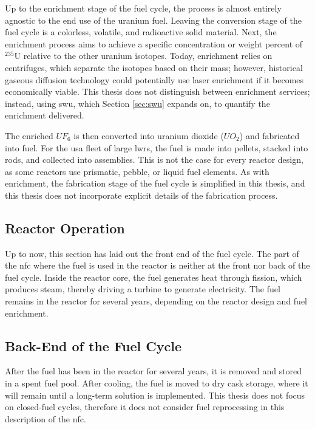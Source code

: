 Up to the enrichment stage of the fuel cycle, the process is almost entirely agnostic to the end use of the uranium fuel. Leaving the conversion stage of the fuel cycle is a colorless, volatile, and radioactive solid material. Next, the enrichment process aims to achieve a specific concentration or weight percent of $^{235}$U relative to the other uranium isotopes. Today, enrichment relies on centrifuges, which separate the isotopes based on their mass; however, historical gaseous diffusion technology could potentially use laser enrichment if it becomes economically viable. This thesis does not distinguish between enrichment services; instead, using \gls{swu}, which Section \ref{sec:swu} expands on, to quantify the enrichment delivered.

The enriched $UF_6$ is then converted into uranium dioxide ($UO_2$) and
fabricated into fuel. For the \gls{usa} fleet of large \glspl{lwr}, the fuel is made into pellets, stacked into rods, and collected into assemblies. This is not the case for every reactor design, as some reactors use prismatic, pebble, or liquid fuel elements. As with enrichment, the fabrication stage of the fuel cycle is simplified in this thesis, and this thesis does not incorporate explicit details of the fabrication process.

\subsection{Reactor Operation}
\label{sec:reactor_operation}
Up to now, this section has laid out the front end of the fuel cycle. The part of the \gls{nfc} where the fuel is used in the reactor is neither at the front nor back of the fuel cycle. Inside the reactor core, the fuel generates heat through fission, which produces steam, thereby driving a turbine to generate electricity. The fuel remains in the reactor for several years, depending on the reactor design and fuel enrichment. %


\subsection{Back-End of the Fuel Cycle}
\label{sec:back_end}
After the fuel has been in the reactor for several years, it is removed and
stored in a spent fuel pool. After cooling, the fuel is moved to dry cask
storage, where it will remain until a long-term solution is implemented.
This thesis does not focus on closed-fuel cycles, therefore it does not consider fuel reprocessing in this description of the \gls{nfc}.

